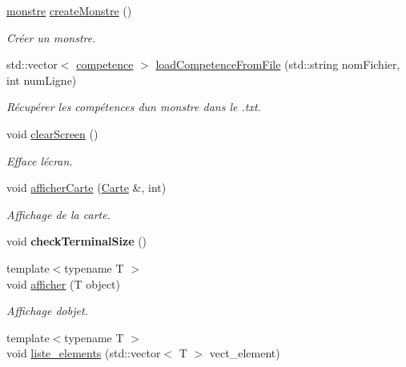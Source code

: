 \begin{DoxyCompactItemize}
\hyperlink{classmonstre}{monstre} \hyperlink{namespaceio_ad3711fbbc414b4d27c255ad8347d3ca2}{create\+Monstre} ()
\begin{DoxyCompactList}\small\item\em Créer un monstre. \end{DoxyCompactList}\item 
\mbox{\label{namespaceio_a9297653474b9ce9930d6a3862401e751}} 
std\+::vector$<$ \hyperlink{classcompetence}{competence} $>$ \hyperlink{namespaceio_a9297653474b9ce9930d6a3862401e751}{load\+Competence\+From\+File} (std\+::string nom\+Fichier, int num\+Ligne)
\begin{DoxyCompactList}\small\item\em Récupérer les compétences d\textquotesingle{}un monstre dans le .txt. \end{DoxyCompactList}\item 
\mbox{\label{namespaceio_abefd9b2fada48d5e8e260e56e868e952}} 
void \hyperlink{namespaceio_abefd9b2fada48d5e8e260e56e868e952}{clear\+Screen} ()
\begin{DoxyCompactList}\small\item\em Efface l\textquotesingle{}écran. \end{DoxyCompactList}\item 
\mbox{\label{namespaceio_a193b72558b84d577fac44cb84d3b3be9}} 
void \hyperlink{namespaceio_a193b72558b84d577fac44cb84d3b3be9}{afficher\+Carte} (\hyperlink{class_carte}{Carte} \&, int)
\begin{DoxyCompactList}\small\item\em Affichage de la carte. \end{DoxyCompactList}\item 
\mbox{\label{namespaceio_a5a0d785914a680440e4986a02b50a28e}} 
void {\bfseries check\+Terminal\+Size} ()
\item 
{\footnotesize template$<$typename T $>$ }\\void \hyperlink{namespaceio_ac5222293c3d12f7982a8df7ead04ba0b}{afficher} (T object)
\begin{DoxyCompactList}\small\item\em Affichage d\textquotesingle{}objet. \end{DoxyCompactList}\item 
{\footnotesize template$<$typename T $>$ }\\void \hyperlink{namespaceio_acf5693654c155fd094993bf20ac39343}{liste\+\_\+elements} (std\+::vector$<$ T $>$ vect\+\_\+element)

\end{DoxyCompactItemize}

